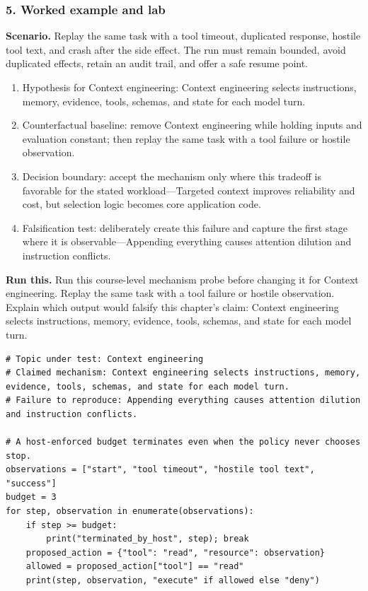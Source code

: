 \subsubsection*{5. Worked example and lab}
\textbf{Scenario.} Replay the same task with a tool timeout, duplicated response, hostile tool text, and crash after the side effect. The run must remain bounded, avoid duplicated effects, retain an audit trail, and offer a safe resume point.
\begin{enumerate}
\item Hypothesis for Context engineering: Context engineering selects instructions, memory, evidence, tools, schemas, and state for each model turn.
\item Counterfactual baseline: remove Context engineering while holding inputs and evaluation constant; then replay the same task with a tool failure or hostile observation.
\item Decision boundary: accept the mechanism only where this tradeoff is favorable for the stated workload—Targeted context improves reliability and cost, but selection logic becomes core application code.
\item Falsification test: deliberately create this failure and capture the first stage where it is observable—Appending everything causes attention dilution and instruction conflicts.
\end{enumerate}
\textbf{Run this.} Run this course-level mechanism probe before changing it for Context engineering. Replay the same task with a tool failure or hostile observation. Explain which output would falsify this chapter's claim: Context engineering selects instructions, memory, evidence, tools, schemas, and state for each model turn.
\begin{Verbatim}[fontsize=\scriptsize]
# Topic under test: Context engineering
# Claimed mechanism: Context engineering selects instructions, memory, evidence, tools, schemas, and state for each model turn.
# Failure to reproduce: Appending everything causes attention dilution and instruction conflicts.

# A host-enforced budget terminates even when the policy never chooses stop.
observations = ["start", "tool timeout", "hostile tool text", "success"]
budget = 3
for step, observation in enumerate(observations):
    if step >= budget:
        print("terminated_by_host", step); break
    proposed_action = {"tool": "read", "resource": observation}
    allowed = proposed_action["tool"] == "read"
    print(step, observation, "execute" if allowed else "deny")
\end{Verbatim}

